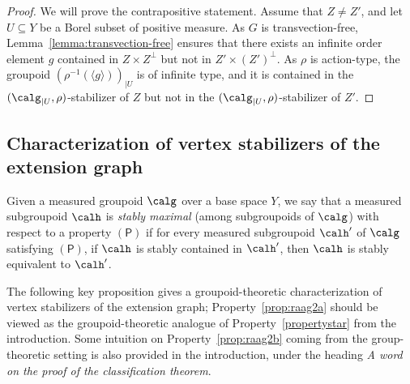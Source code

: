 \begin{proof}
We will prove the contrapositive statement. Assume that $Z\neq Z'$, and let $U\subseteq Y$ be a Borel subset of positive measure. As $G$ is transvection-free, Lemma~\ref{lemma:transvection-free} ensures that there exists an infinite order element $g$ contained in $Z\times Z^\perp$ but not in $Z'\times (Z')^{\perp}$. As $\rho$ is action-type, the groupoid $(\rho^{-1}(\langle g\rangle))_{|U}$ is of infinite type, and it is contained in the $(\calg_{|U},\rho)$-stabilizer of $Z$ but not in the $(\calg_{|U},\rho)$-stabilizer of $Z'$.
\end{proof}

\subsection{Characterization of vertex stabilizers of the extension graph}\label{sec:vertex}

Given a measured groupoid $\calg$ over a base space $Y$, we say that a measured subgroupoid $\calh$ is \emph{stably maximal} (among subgroupoids of $\calg$) with respect to a property $(\mathsf{P})$ if for every measured subgroupoid $\calh'$ of $\calg$ satisfying $(\mathsf{P})$, if $\calh$ is stably contained in $\calh'$, then $\calh$ is stably equivalent to $\calh'$.

The following key proposition gives a groupoid-theoretic characterization of vertex stabilizers of the extension graph; Property~\eqref{prop:raag2a} should be viewed as the groupoid-theoretic analogue of Property~\eqref{propertystar} from the introduction. Some intuition on Property~\eqref{prop:raag2b} coming from the group-theoretic setting is also provided in the introduction, under the heading \emph{A word on the proof of the classification theorem}.

